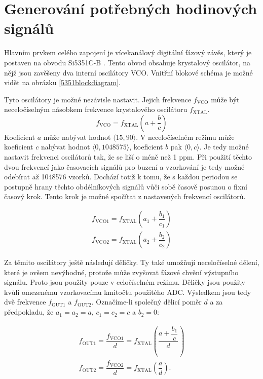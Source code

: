 \section{Generování potřebných hodinových signálů}
Hlavním prvkem celého zapojení je vícekanálový digitální fázový závěs, který je postaven na obvodu Si5351C-B \cite{Si5351datasheet}. Tento obvod obsahuje krystalový oscilátor, na nějž jsou zavěšeny dva interní oscilátory \acrshort{VCO}. Vnitřní blokové schéma je možné vidět na obrázku \ref{5351blockdiagram}.

Tyto oscilátory je možné nezávisle nastavit. Jejich frekvence $f_\mathrm{VCO}$ může být neceločíselným násobkem frekvence krystalového oscilátoru $f_\mathrm{XTAL}$.
\begin{equation}
f_\mathrm{VCO}=f_\mathrm{XTAL} \left(a+\dfrac{b}{c} \right)
\end{equation}
Koeficient $a$ může nabývat hodnot $\langle 15, 90 \rangle$. V neceločíselném režimu může koeficient $c$ nabývat hodnot $\langle 0, 1048575 \rangle$, koeficient $b$ pak $\langle 0, c \rangle$.
Je tedy možné nastavit frekvenci oscilátorů tak, že se liší o méně než 1 ppm. Při použití těchto dvou frekvencí jako časovacích signálů pro buzení a vzorkování je tedy možné odebírat až 1048576 vzorků. Dochází totiž k tomu, že s každou periodou se postupně hrany těchto obdélníkových signálů vůči sobě časově posunou o fixní časový krok. Tento krok je možné spočítat z nastavených frekvencí oscilátorů.

\begin{equation}
\begin{gathered}
f_\mathrm{VCO1}=f_\mathrm{XTAL} \left(a_1+\dfrac{b_1}{c_1} \right) \\
f_\mathrm{VCO2}=f_\mathrm{XTAL} \left(a_2+\dfrac{b_2}{c_2} \right)
\end{gathered}
\end{equation}

Za těmito oscilátory ještě následují děličky. Ty také umožňují neceločíselné dělení, které je ovšem nevýhodné, protože může zvyšovat fázové chvění výstupního signálu. Proto jsou použity pouze v celočíselném režimu. Děličky jsou použity kvůli omezenému vzorkovacímu kmitočtu použitého \acrshort{ADC}. Výsledkem jsou tedy dvě frekvence $f_\mathrm{OUT1}$ a $f_\mathrm{OUT2}$. Označíme-li společný dělicí poměr $d$ a za předpokladu, že $a_1=a_2=a$, $c_1=c_2=c$ a $b_2=0$:

\begin{equation}
\begin{gathered}
f_\mathrm{OUT1}=\dfrac{f_\mathrm{VCO1}}{d}=f_\mathrm{XTAL} \left(\dfrac{a+\dfrac{b_1}{c} }{d}\right) \\
f_\mathrm{OUT2}=\dfrac{f_\mathrm{VCO2}}{d}=f_\mathrm{XTAL} \left(\dfrac{a}{d}\right).
\end{gathered}
\end{equation}


